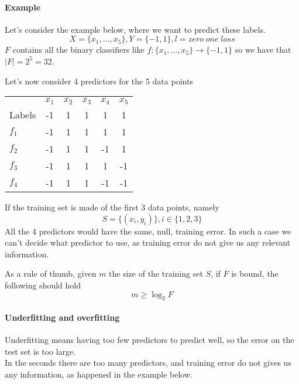 \paragraph{Example}
Let's consider the example below, where we want to predict these labels.
$$X = \{x_1, \dots, x_5\}, Y = \{-1,1\}, l = \mathit{zero\;one\;loss}$$
$F$ contains all the binary classifiers like
$f : \{x_1, \dots, x_5\} \longrightarrow \{-1,1\}$
so we have that $|F| = 2^5 = 32$. 

Let's now consider 4 predictors for the 5 data points
\begin{center}
    \begin{tabular}{l c c c c c}
     & $x_1$ & $x_2$ & $x_3$ & $x_4$ & $x_5$ \\
     Labels & -1 & 1 & 1 & 1 & 1\\
     \hline
    $f_1$ & -1 & 1 & 1 & 1 & 1 \\
    $f_2$ & -1 & 1 & 1 & -1 & 1 \\
    $f_3$ & -1 & 1 & 1 & 1 & -1 \\
    $f_4$ & -1 & 1 & 1 & -1 & -1 \\
    \end{tabular}
\end{center}
If the training set is made of the first 3 data points, namely 
$$S = \{(x_i, y_i)\}, i \in \{1,2,3\}$$
All the 4 predictors would have the same, null, training error.
In such a case we can't decide what predictor to use, as training error do not give 
us any relevant information.

As a rule of thumb, given $m$ the size of the training set $S$, if $F$ is bound, 
the following should hold
$$m \geq \log_2 F$$

\paragraph{Underfitting and overfitting} 
Underfitting means having too few predictors to predict well, 
so the error on the test set is too large.\\
In the seconds there are too many predictors, and training error do 
not gives us any information, as happened in the example below. 